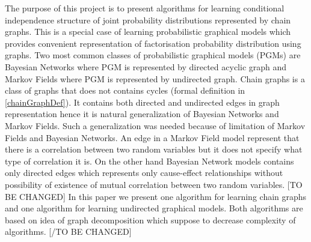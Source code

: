 

The purpose of this project is to present algorithms for learning conditional independence structure of joint probability distributions represented by chain graphs. This is a special case of learning probabilistic graphical models which provides convenient representation of factorisation probability distribution using graphs.
Two most common classes of probabilistic graphical models (PGMs) are Bayesian Networks where PGM is represented by directed acyclic graph and Markov Fields where PGM is represented by undirected graph. Chain graphs is a class of graphs that does not contains cycles (formal definition in \ref{chainGraphDef}). It contains both directed and undirected edges in graph representation hence it is natural generalization of Bayesian Networks and Markov Fields.
Such a generalization was needed because of limitation of Markov Fields and Bayesian Networks. An edge in a Markov Field model represent that there is a correlation between two random variables but it does not specify what type of correlation
it is. On the other hand Bayesian Network models contains only directed edges which represents only cause-effect relationships without possibility of existence of mutual correlation between two random variables.
[TO BE CHANGED] In this paper we present one algorithm for learning chain graphs and one algorithm for learning undirected graphical models. Both algorithms are based on idea of graph decomposition which suppose to decrease complexity of algorithms. [/TO BE CHANGED]
